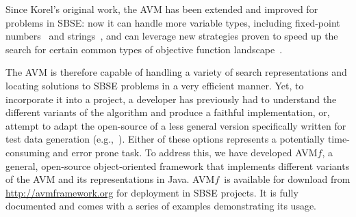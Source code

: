 \documentclass{llncs}
\newcommand{\name}{\mbox{AVM\hspace{-1pt}$f$}\xspace}
\newcommand{\repourl}{\url{http://avmframework.org}\xspace}
\begin{document}

Since Korel's original work, the AVM has been extended and improved for problems in SBSE: now it can handle more variable
types, including fixed-point numbers~\cite{Harman2007} and strings~\cite{Kapfhammer2013,McMinn2015}, and can leverage
new strategies proven to speed up the search for certain common types of objective function landscape~\cite{Kempka2013,Kempka2015}.

The AVM is therefore capable of handling a variety of search representations and locating solutions to SBSE problems in
a very efficient manner. Yet, to incorporate it into a project, a developer has previously had to understand the
different variants of the algorithm and produce a faithful implementation, or, attempt to adapt the open-source of a
less general version specifically written for test data generation (e.g.,~\cite{Lakhotia2013}). Either of these options represents a potentially time-consuming and error prone task. To address this, we have developed \name, a general, open-source object-oriented framework that
implements different variants of the AVM and its representations in Java. \name~is available for download
from \repourl for deployment in SBSE projects. It is fully documented and comes with a series of examples demonstrating its usage.


\end{document}
